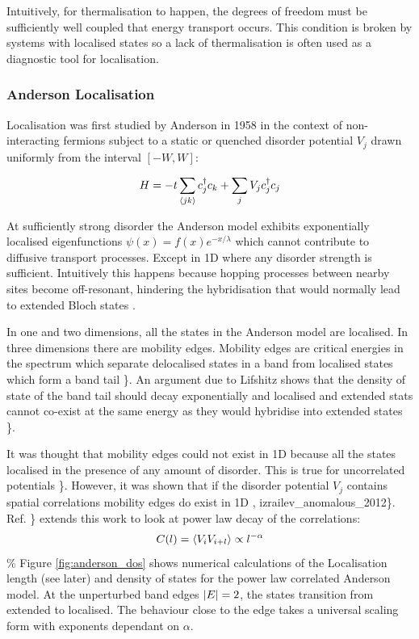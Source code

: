 Intuitively, for thermalisation to happen, the degrees of freedom must
be sufficiently well coupled that energy transport occurs. This
condition is broken by systems with localised states so a lack of
thermalisation is often used as a diagnostic tool for localisation.

\hypertarget{anderson-localisation}{%
\subsubsection{Anderson Localisation}\label{anderson-localisation}}

Localisation was first studied by Anderson in 1958
\textcite{anderson_absence_1958-1} in the context of non-interacting
fermions subject to a static or quenched disorder potential \(V_j\)
drawn uniformly from the interval \([-W,W]\):

\[
H = -t\sum_{\langle jk \rangle} c^\dagger_j c_k + \sum_j V_j c_j^\dagger c_j
\]

At sufficiently strong disorder the Anderson model exhibits
exponentially localised eigenfunctions \(\psi(x) = f(x) e^{-x/\lambda}\)
which cannot contribute to diffusive transport processes. Except in 1D
where any disorder strength is sufficient. Intuitively this happens
because hopping processes between nearby sites become off-resonant,
hindering the hybridisation that would normally lead to extended Bloch
states \textcite{kramer_localization_1993}.

In one and two dimensions, all the states in the Anderson model are
localised. In three dimensions there are mobility edges. Mobility edges
are critical energies in the spectrum which separate delocalised states
in a band from localised states which form a band tail
\textcite{abanin_recent_2017}\}. An argument due to Lifshitz shows that
the density of state of the band tail should decay exponentially and
localised and extended stats cannot co-exist at the same energy as they
would hybridise into extended states
\textcite{kramer_localization_1993}\}.

It was thought that mobility edges could not exist in 1D because all the
states localised in the presence of any amount of disorder. This is true
for uncorrelated potentials \textcite{goldshtein_pure_1977}\}. However,
it was shown that if the disorder potential \(V_j\) contains spatial
correlations mobility edges do exist in 1D
\textcite{izrailev_localization_1999}, izrailev\_anomalous\_2012\}. Ref.
\textcite{croy_anderson_2011}\} extends this work to look at power law
decay of the correlations:
\[ C(l) = \langle V_i V_{i+l} \rangle \propto l^{-\alpha} \] \% Figure
\ref{fig:anderson_dos} shows numerical calculations of the Localisation
length (see later) and density of states for the power law correlated
Anderson model. At the unperturbed band edges \(\abs{E} = 2\), the
states transition from extended to localised. The behaviour close to the
edge takes a universal scaling form with exponents dependant on
\(\alpha\).

